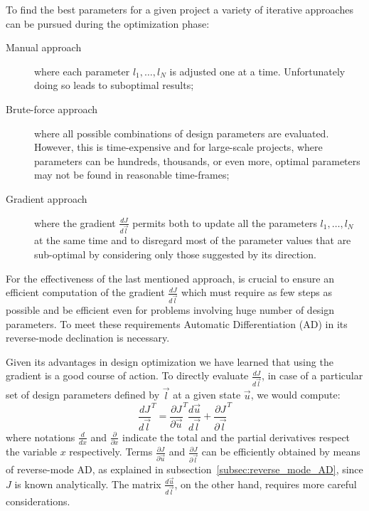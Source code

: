 To find the best parameters for a given project a variety of iterative approaches can be pursued during the optimization phase:
\begin{description}
	\item[Manual approach] where each parameter $l_1, \dots, l_N$ is adjusted one at a time. Unfortunately doing so leads to suboptimal results;
	\item[Brute-force approach] where all possible combinations of design parameters are evaluated. However, this is time-expensive and for large-scale projects, where parameters can be hundreds, thousands, or even more, optimal parameters may not be found in reasonable time-frames;
	\item[Gradient approach] where the gradient $\frac{dJ}{d\vec{l}}$ permits both to update all the parameters $l_1, \dots, l_N$ at the same time and to disregard most of the parameter values that are sub-optimal by considering only those suggested by its direction.
\end{description}
For the effectiveness of the last mentioned approach, is crucial to ensure an efficient computation of the gradient $\frac{dJ}{d\vec{l}}$ which must require as few steps as possible and be efficient even for problems involving huge number of design parameters. To meet these requirements Automatic Differentiation (AD) in its reverse-mode declination is necessary.

\bigskip
Given its advantages in design optimization we have learned that using the gradient is a good course of action. To directly evaluate $\frac{dJ}{d\vec{l}}$, in case of a particular set of design parameters defined by $\vec{l}$ at a given state $\vec{u}$, we would compute:
\begin{equation}
	\label{eqn:generic_gradient_design_opt}
	\frac{dJ}{d\vec{l}}^T = \frac{\partial J}{\partial \vec{u}}^T \frac{d\vec{u}}{d\vec{l}} + \frac{\partial J}{\partial \vec{l}}^T
\end{equation}
where notations $\frac{d}{dx}$ and $\frac{\partial}{\partial x}$ indicate the total and the partial derivatives respect the variable $x$ respectively.
Terms $\frac{\partial J}{\partial \vec{u}}$ and $\frac{\partial J}{\partial \vec{l}}$ can be efficiently obtained by means of reverse-mode AD, as explained in subsection~\vref{subsec:reverse_mode_AD}, since $J$ is known analytically. The matrix $\frac{d\vec{u}}{d\vec{l}}$, on the other hand, requires more careful considerations.

